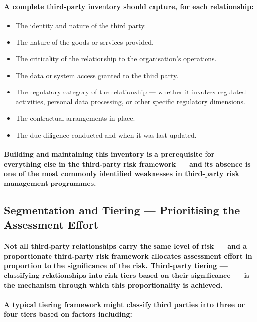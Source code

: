 \paragraph{A complete third-party inventory should capture, for each relationship:}
\begin{itemize}
    \item{The identity and nature of the third party.}
    \item{The nature of the goods or services provided.}
    \item{The criticality of the relationship to the organisation's operations.}
    \item{The data or system access granted to the third party.}
    \item{The regulatory category of the relationship — whether it involves regulated activities, personal data processing, or other specific regulatory dimensions.}
    \item{The contractual arrangements in place.}
    \item{The due diligence conducted and when it was last updated.}
\end{itemize}
\paragraph{Building and maintaining this inventory is a prerequisite for everything else in the third-party risk framework — and its absence is one of the most commonly identified weaknesses in third-party risk management programmes.}

\subsection{Segmentation and Tiering — Prioritising the Assessment Effort}
\paragraph{Not all third-party relationships carry the same level of risk — and a proportionate third-party risk framework allocates assessment effort in proportion to the significance of the risk. Third-party tiering — classifying relationships into risk tiers based on their significance — is the mechanism through which this proportionality is achieved.}
\paragraph{A typical tiering framework might classify third parties into three or four tiers based on factors including:}
